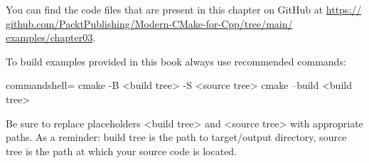 You can find the code files that are present in this chapter on GitHub at \url{https:// github.com/PacktPublishing/Modern-CMake-for-Cpp/tree/main/ examples/chapter03}.

To build examples provided in this book always use recommended commands:

\begin{tcblisting}{commandshell={}}
cmake -B <build tree> -S <source tree>
cmake --build <build tree>
\end{tcblisting}

Be sure to replace placeholders <build tree> and <source tree> with appropriate paths. As a reminder: build tree is the path to target/output directory, source tree is the path at which your source code is located.














